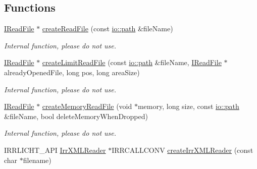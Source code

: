 \subsection*{Functions}
\begin{DoxyCompactItemize}
\item 
\mbox{\label{namespaceirr_1_1io_a16ff593e91ead74120ac459c4fe97bcf}} 
\hyperlink{classirr_1_1io_1_1IReadFile}{I\+Read\+File} $\ast$ \hyperlink{namespaceirr_1_1io_a16ff593e91ead74120ac459c4fe97bcf}{create\+Read\+File} (const \hyperlink{namespaceirr_1_1io_ab1bdc45edb3f94d8319c02bc0f840ee1}{io\+::path} \&file\+Name)
\begin{DoxyCompactList}\small\item\em Internal function, please do not use. \end{DoxyCompactList}\item 
\mbox{\label{namespaceirr_1_1io_aaffde8ef59ed98d4606a342caddca8e1}} 
\hyperlink{classirr_1_1io_1_1IReadFile}{I\+Read\+File} $\ast$ \hyperlink{namespaceirr_1_1io_aaffde8ef59ed98d4606a342caddca8e1}{create\+Limit\+Read\+File} (const \hyperlink{namespaceirr_1_1io_ab1bdc45edb3f94d8319c02bc0f840ee1}{io\+::path} \&file\+Name, \hyperlink{classirr_1_1io_1_1IReadFile}{I\+Read\+File} $\ast$already\+Opened\+File, long pos, long area\+Size)
\begin{DoxyCompactList}\small\item\em Internal function, please do not use. \end{DoxyCompactList}\item 
\mbox{\label{namespaceirr_1_1io_ab30f7cd10d675fa7da0a936a7bd67d4a}} 
\hyperlink{classirr_1_1io_1_1IReadFile}{I\+Read\+File} $\ast$ \hyperlink{namespaceirr_1_1io_ab30f7cd10d675fa7da0a936a7bd67d4a}{create\+Memory\+Read\+File} (void $\ast$memory, long size, const \hyperlink{namespaceirr_1_1io_ab1bdc45edb3f94d8319c02bc0f840ee1}{io\+::path} \&file\+Name, bool delete\+Memory\+When\+Dropped)
\begin{DoxyCompactList}\small\item\em Internal function, please do not use. \end{DoxyCompactList}\item 
I\+R\+R\+L\+I\+C\+H\+T\+\_\+\+A\+PI \hyperlink{namespaceirr_1_1io_a1628edbb9d5d53f18c82d2a92b0ad27e}{Irr\+X\+M\+L\+Reader} $\ast$I\+R\+R\+C\+A\+L\+L\+C\+O\+NV \hyperlink{namespaceirr_1_1io_a581f4d4648398759c61266d63d7106b1}{create\+Irr\+X\+M\+L\+Reader} (const char $\ast$filename)

\end{DoxyCompactItemize}

